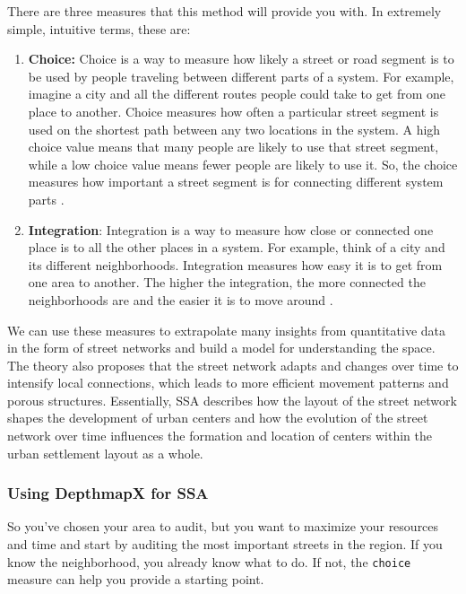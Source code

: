 \documentclass[
]{latex/krantz}
\begin{document}
There are three measures that this method will provide you with. In extremely simple, intuitive terms, these are:

\begin{enumerate}
\def\labelenumi{\arabic{enumi}.}
\item
  \textbf{Choice:} Choice is a way to measure how likely a street or road segment is to be used by people traveling between different parts of a system. For example, imagine a city and all the different routes people could take to get from one place to another. Choice measures how often a particular street segment is used on the shortest path between any two locations in the system. A high choice value means that many people are likely to use that street segment, while a low choice value means fewer people are likely to use it. So, the choice measures how important a street segment is for connecting different system parts \autocite{hillierSocialLogicSpace1984}.
\item
  \textbf{Integration}: Integration is a way to measure how close or connected one place is to all the other places in a system. For example, think of a city and its different neighborhoods. Integration measures how easy it is to get from one area to another. The higher the integration, the more connected the neighborhoods are and the easier it is to move around \autocite{hillierSocialLogicSpace1984}.
\end{enumerate}

We can use these measures to extrapolate many insights from quantitative data in the form of street networks and build a model for understanding the space. The theory also proposes that the street network adapts and changes over time to intensify local connections, which leads to more efficient movement patterns and porous structures. Essentially, SSA describes how the layout of the street network shapes the development of urban centers and how the evolution of the street network over time influences the formation and location of centers within the urban settlement layout as a whole.

\hypertarget{using-depthmapx-for-ssa}{%
\subsubsection{Using DepthmapX for SSA}\label{using-depthmapx-for-ssa}}

So you've chosen your area to audit, but you want to maximize your resources and time and start by auditing the most important streets in the region. If you know the neighborhood, you already know what to do. If not, the \texttt{choice} measure can help you provide a starting point.
\end{document}
